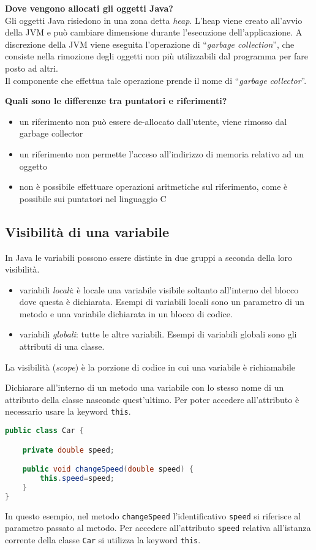 \documentclass{article}
\begin{document}
\textbf{Dove vengono allocati gli oggetti Java?}\\
Gli oggetti Java risiedono in una zona detta \emph{heap}. L'heap viene creato all'avvio della JVM e può cambiare dimensione durante l'esecuzione 
dell'applicazione. A discrezione della JVM viene eseguita l'operazione di ``\emph{garbage collection}'', che consiste nella rimozione degli oggetti non più utilizzabili dal programma per fare posto ad altri.\\
Il componente che effettua tale operazione prende il nome di ``\emph{garbage collector}''.


\textbf{Quali sono le differenze tra puntatori e riferimenti?}
\begin{itemize}
\item un riferimento non può essere de-allocato dall'utente, viene rimosso dal garbage collector
\item un riferimento non permette l'acceso all'indirizzo di memoria relativo ad un oggetto%
\item non è possibile effettuare operazioni aritmetiche sul riferimento, come è possibile sui puntatori nel linguaggio C
\end{itemize}

\subsection{Visibilità di una variabile}

In Java le variabili possono essere distinte in due gruppi a seconda della loro visibilità.
\begin{itemize}
\item variabili \emph{locali}: è locale una variabile visibile soltanto all'interno del blocco dove questa è dichiarata.
Esempi di variabili locali sono un parametro di un metodo e una variabile dichiarata in un blocco di codice.
\item variabili \emph{globali}: tutte le altre variabili. Esempi di variabili globali sono gli attributi di una classe.
\end{itemize}

\begin{mydef} La visibilità (\emph{scope}) è la porzione di codice in cui una variabile è richiamabile
\end{mydef}
Dichiarare all'interno di un metodo una variabile con lo stesso nome di un attributo della classe nasconde quest'ultimo.
Per poter accedere all'attributo è necessario usare la keyword \texttt{this}.
\begin{lstlisting}[language=Java,escapechar=|]
public class Car {

	private double speed;

	public void changeSpeed(double speed) {
        this.speed=speed;   
   	}
}
\end{lstlisting}
In questo esempio, nel metodo \texttt{changeSpeed} l'identificativo \texttt{speed} si riferisce al parametro passato al metodo.
Per accedere all'attributo \texttt{speed} relativa all'istanza corrente della classe \texttt{Car} si utilizza la keyword \texttt{this}. 
\end{document}
